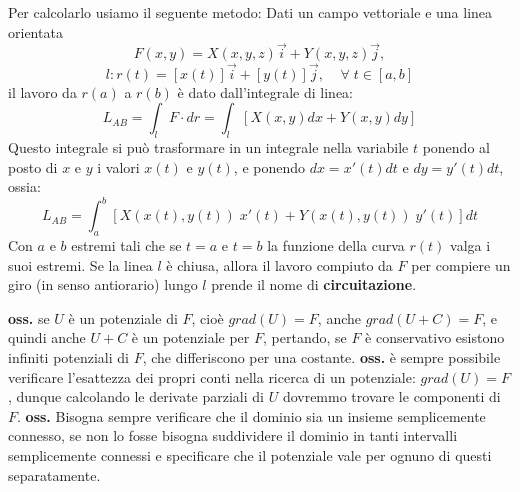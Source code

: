 \begin{itemize}
\[    \]
    Per calcolarlo usiamo il seguente metodo:\newline
    Dati un campo vettoriale e una linea orientata
    \[
        F(x,y) = X(x,y,z) \vec{i} + Y(x,y,z)\vec{j},
    \]
    \[
        l: r(t) = [x(t)]\vec{i} + [y(t)]\vec{j}, \;\;\; \;\forall\;t \in[a,b]
    \]
    il lavoro da $r(a)$ a $r(b)$ è dato dall'integrale di linea:
    \[
        L_{AB}= \int_{l} F \cdot  dr = \int_{l}[X(x,y)dx + Y(x,y)dy]
    \]
    Questo integrale si può trasformare in un integrale nella variabile $t$ ponendo al posto di $x$ e $y$ i valori $x(t)$ e $y(t)$, e ponendo $dx = x'(t) dt$ e $dy = y'(t) dt$, ossia:
    \[
        L_{AB} = \int_{a}^{b} \left[X(x(t), y(t)) \; x'(t) + Y(x(t),y(t)) \;y'(t)\right]dt
    \]
    Con $a$ e $b$ estremi tali che se $t=a$ e $t=b$ la funzione della curva $r(t)$ valga i suoi estremi.\newline
    \newline
    Se la linea $l$ è chiusa, allora il lavoro compiuto da $F$ per compiere un giro (in senso antiorario) lungo $l$ prende il nome di \textbf{circuitazione}.
\end{itemize}
\textbf{oss.} se $U$ è un potenziale di $F$, cioè $grad(U) = F$, anche $grad(U+C) = F$, e quindi anche $U+C$ è un potenziale per $F$, pertando, se $F$ è conservativo esistono infiniti potenziali di $F$, che differiscono per una costante.\newline
\newline
\textbf{oss.} è sempre possibile  verificare l'esattezza dei propri conti nella ricerca di un potenziale: $grad(U) = F$, dunque calcolando le derivate parziali di $U$ dovremmo trovare le componenti di $F$.\newline
\newline
\textbf{oss.} Bisogna sempre verificare che il dominio sia un insieme semplicemente connesso, se non lo fosse bisogna suddividere il dominio in tanti intervalli semplicemente connessi e specificare che il potenziale vale per ognuno di questi separatamente.
